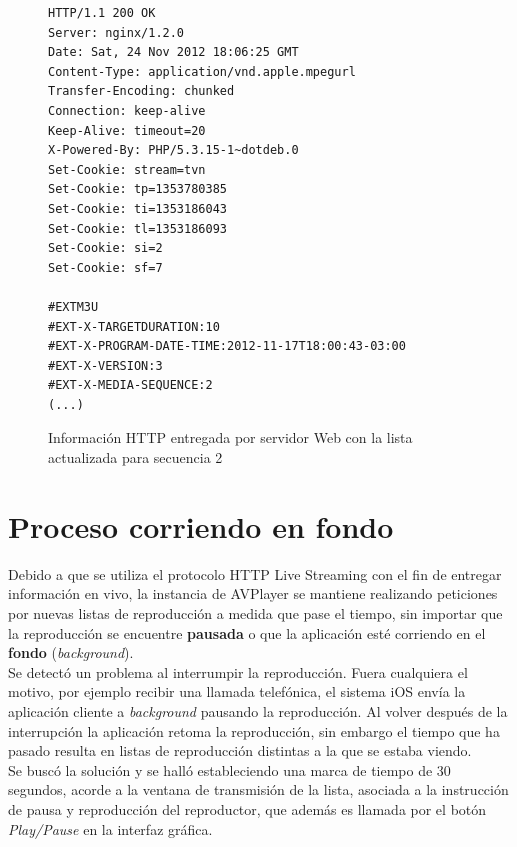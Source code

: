 \begin{figure}[H]
	\centering
\begin{lstlisting}
HTTP/1.1 200 OK
Server: nginx/1.2.0
Date: Sat, 24 Nov 2012 18:06:25 GMT
Content-Type: application/vnd.apple.mpegurl
Transfer-Encoding: chunked
Connection: keep-alive
Keep-Alive: timeout=20
X-Powered-By: PHP/5.3.15-1~dotdeb.0
Set-Cookie: stream=tvn
Set-Cookie: tp=1353780385
Set-Cookie: ti=1353186043
Set-Cookie: tl=1353186093
Set-Cookie: si=2
Set-Cookie: sf=7

#EXTM3U
#EXT-X-TARGETDURATION:10
#EXT-X-PROGRAM-DATE-TIME:2012-11-17T18:00:43-03:00
#EXT-X-VERSION:3
#EXT-X-MEDIA-SEQUENCE:2
(...)
\end{lstlisting}
\caption{Información HTTP entregada por servidor Web con la lista actualizada para secuencia 2}
\label{lst:sequence2}
\end{figure}





\section{Proceso corriendo en fondo} %

Debido a que se utiliza el protocolo HTTP Live Streaming con el fin de entregar información en vivo, la instancia de AVPlayer se mantiene realizando peticiones por nuevas listas de reproducción a medida que pase el tiempo, sin importar que la reproducción se encuentre \textbf{pausada} o que la aplicación esté corriendo en el \textbf{fondo} (\textit{background}).\\

Se detectó un problema al interrumpir la reproducción. Fuera cualquiera el motivo, por ejemplo recibir una llamada telefónica, el sistema iOS envía la aplicación cliente a \textit{background} pausando la reproducción. Al volver después de la interrupción la aplicación retoma la reproducción, sin embargo el tiempo que ha pasado resulta en listas de reproducción distintas a la que se estaba viendo.\\

Se buscó la solución y se halló estableciendo una marca de tiempo de 30 segundos, acorde a la ventana de transmisión de la lista, asociada a la instrucción de pausa y reproducción del reproductor, que además es llamada por el botón \textit{Play/Pause} en la interfaz gráfica.\\

